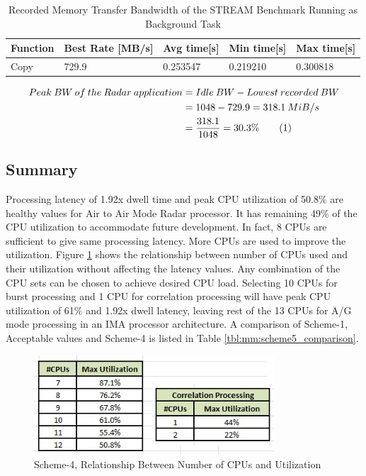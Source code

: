 \begin{table}[h!]
	\centering
	\begin{tabular}{|l|l|l|l|l|} 
	 \hline
	 \textbf{Function} & \textbf{Best Rate [MB/s]} & \textbf{Avg time[s]} & \textbf{Min time[s]} & \textbf{Max time[s]} \\
	 \hline
	 Copy & 729.9 & 0.253547 & 0.219210 & 0.300818\\ \hline
	\end{tabular}
	\caption{Recorded Memory Transfer Bandwidth of the STREAM Benchmark Running as Background Task}
	\label{tbl:mm:scheme5_mem_bw}
\end{table}

\begin{align*}
\label{aa:scheme4:mem_bw}
	Peak \: BW \: of \: the \: Radar \: application &= Idle \: BW - Lowest \: recorded \: BW \\
	&= 1048 - 729.9 =  318.1 \: MiB/s \\
	&= \frac{318.1}{1048} = 30.3 \% \stepcounter{equation}\tag{\theequation} 
\end{align*}

\subsection{Summary}
\label{ss:mm:scheme5:summary}

Processing latency of 1.92x dwell time and peak CPU utilization of 50.8\% are healthy values for Air to Air Mode Radar processor. It has remaining 49\% of the CPU utilization to accommodate future development. In fact, 8 CPUs are sufficient to give same processing latency. More CPUs are used to improve the utilization. Figure \ref{fig:mm:scheme5_summary} shows the relationship between number of CPUs used and their utilization without affecting the latency values. Any combination of the CPU sets can be chosen to achieve desired CPU load. Selecting 10 CPUs for burst processing and 1 CPU for correlation processing will have peak CPU utilization of 61\% and 1.92x dwell latency, leaving rest of the 13 CPUs for A/G mode processing in an IMA processor architecture. A comparison of  Scheme-1, Acceptable values and Scheme-4 is listed in Table \ref{tbl:mm:scheme5_comparison}.

\begin{figure}[h!]
	\centering
	\includegraphics[width=90mm]{figures/scheme5_summary}
	\caption{Scheme-4, Relationship Between Number of CPUs and Utilization}
	\label{fig:mm:scheme5_summary}
\end{figure}

